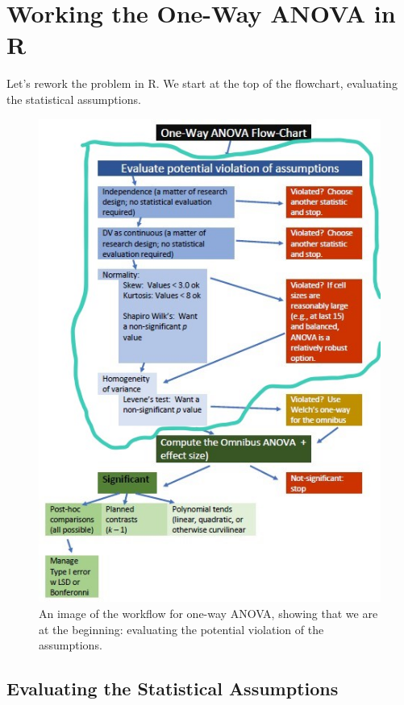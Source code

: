 \documentclass[
  english,
]{book}
\begin{document}
\hypertarget{working-the-one-way-anova-in-r}{%
\section{Working the One-Way ANOVA in R}\label{working-the-one-way-anova-in-r}}

Let's rework the problem in R. We start at the top of the flowchart, evaluating the statistical assumptions.

\begin{figure}
\centering
\includegraphics{images/OnewayWrkFlw_Asmptns.jpg}
\caption{An image of the workflow for one-way ANOVA, showing that we are at the beginning: evaluating the potential violation of the assumptions.}
\end{figure}

\hypertarget{evaluating-the-statistical-assumptions}{%
\subsection{Evaluating the Statistical Assumptions}\label{evaluating-the-statistical-assumptions}}
\end{document}
